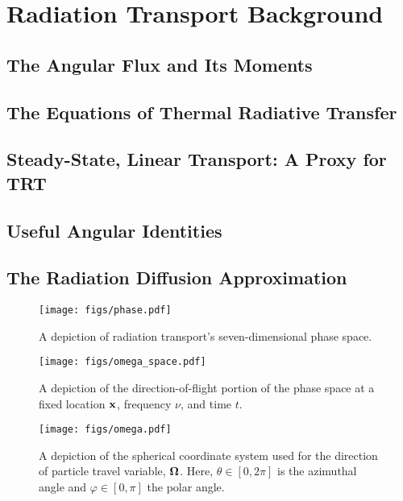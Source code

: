 \documentclass[../doc.tex]{subfiles}
\begin{document}
\chapter{Radiation Transport Background}
\section{The Angular Flux and Its Moments}
\section{The Equations of Thermal Radiative Transfer}
\section{Steady-State, Linear Transport: A Proxy for TRT}
\section{Useful Angular Identities}
\section{The Radiation Diffusion Approximation}

\begin{figure}
\centering
\texttt{[image: figs/phase.pdf]}
\caption{A depiction of radiation transport's seven-dimensional phase space. }
\label{trans:phase}
\end{figure}

\begin{figure}
\centering
\texttt{[image: figs/omega\_space.pdf]}
\caption{A depiction of the direction-of-flight portion of the phase space at a fixed location $\boldsymbol{\mathrm{x}}$, frequency $\nu$, and time $t$. }
\label{trans:omega_space_diag}
\end{figure}

\begin{figure}
\centering
\texttt{[image: figs/omega.pdf]}
\caption{A depiction of the spherical coordinate system used for the direction of particle travel variable, $\boldsymbol{\Omega}$. Here, $\theta \in [0,2\pi]$ is the azimuthal angle and $\varphi \in [0,\pi]$ the polar angle. }
\label{trans:omega_diagram}
\end{figure}
\end{document}
